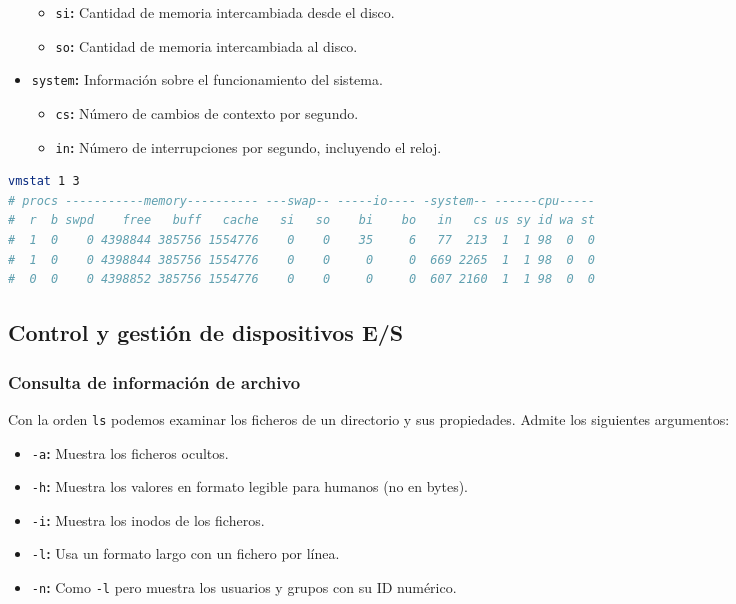 \begin{itemize}
	\begin{itemize}
		\item\texttt{si}\textbf{:} Cantidad de memoria intercambiada desde el disco.
		\item\texttt{so}\textbf{:} Cantidad de memoria intercambiada al disco.
	\end{itemize}
	\item\texttt{system}\textbf{:} Información sobre el funcionamiento del sistema.
	\begin{itemize}
		\item\texttt{cs}\textbf{:} Número de cambios de contexto por segundo.
		\item\texttt{in}\textbf{:} Número de interrupciones por segundo, incluyendo el reloj.
	\end{itemize}
\end{itemize}

\begin{lstlisting}[language=Bash]
vmstat 1 3
# procs -----------memory---------- ---swap-- -----io---- -system-- ------cpu-----
#  r  b swpd    free   buff   cache   si   so    bi    bo   in   cs us sy id wa st
#  1  0    0 4398844 385756 1554776    0    0    35     6   77  213  1  1 98  0  0
#  1  0    0 4398844 385756 1554776    0    0     0     0  669 2265  1  1 98  0  0
#  0  0    0 4398852 385756 1554776    0    0     0     0  607 2160  1  1 98  0  0
\end{lstlisting}

\subsection{Control y gestión de dispositivos E/S}

\subsubsection{Consulta de información de archivo}

Con la orden \texttt{ls} podemos examinar los ficheros de un directorio y sus propiedades.
Admite los siguientes argumentos:

\begin{itemize}
	\item\texttt{-a}\textbf{:} Muestra los ficheros ocultos.
	\item\texttt{-h}\textbf{:} Muestra los valores en formato legible para humanos (no en bytes).
	\item\texttt{-i}\textbf{:} Muestra los inodos de los ficheros.
	\item\texttt{-l}\textbf{:} Usa un formato largo con un fichero por línea.
	\item\texttt{-n}\textbf{:} Como \texttt{-l} pero muestra los usuarios y grupos con su ID numérico.
\end{itemize}

